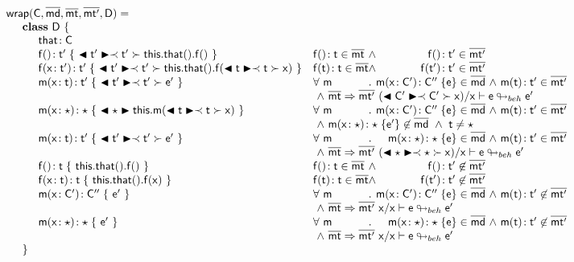 \documentclass[a4paper,USenglish]{tex/lipics-v2016}
\begin{document}
\scriptsize
\newcommand{\bscast}[2]{\EM{\BehCast{#1}{\ShaCast{#1}{#2}}}}
\vspace{4mm}
\[\begin{array}{@{}ll@{}l@{}r@{~}c@{~}r}
    \wrap\C{\b\md}\bmt\bmtp\D = \\
\SP \class ~\D ~ \{\\
\SPP \Fdef\that\C \\
\SPP \Mdefz\f{\tp}{~\bscast\tp{\Get{\Get\this\that}\f}~}
&    \Mtype\f{}\t\in\bmt &\wedge& \Mtype\f{}\tp \in \bmtp
\\
\SPP \Mdef\f\x\tp\tp {~\bscast\tp{\Set{\Get\this\that}\f{\bscast\t\x}}~}
&    \Mtype\f\t\t \in \bmt &\wedge& \Mtype\f\tp\tp \in \bmtp
\\
\SPP \Mdef\m\x\t\tp {~\bscast\tp{{\ep}}~}
&     \All \m \Mdef\m\x\Cp\Cpp\e\in\b\md &\wedge& \Mtype\m\t\tp\in\bmtp \\
&\multicolumn{5}{l}{~\wedge~\rtranst{\bmt}\bmtp{(\bscast\Cp\x)}\x{\e}{\ep}}
\\
\SPP \Mdef\m\x\any\any {~\BehCast\any{\Call\this\m{\bscast{\t}\x}}~}
&     \All \m \Mdef\m\x\Cp\Cpp\e\in\b\md &\wedge& \Mtype\m\t\tp\in\bmtp\\
&\multicolumn{5}{l}{~\wedge~\Mdef\m\x\any\any{\e'}\not\in\b\md~\wedge~\t\neq\any}
\\
\SPP \Mdef\m\x\t\tp{~\bscast\tp{\ep}~}
&    \All \m \Mdef\m\x\any\any\e\in\b\md &\wedge& \Mtype\m\t\tp\in\bmtp \\
&\multicolumn{5}{l}{~\wedge~\rtranst{\bmt}\bmtp{(\bscast\any\x)}\x\e{\ep}}
\\
\SPP \Mdefz\f\t { ~\Get{\Get\this\that}\f~}
&    \Mtype\f{}\t \in \bmt &\wedge& \Mtype\f{}\tp \not\in \bmtp
\\
\SPP \Mdef\f\x\t\t { ~\Set{\Get\this\that}\f\x~}
&    \Mtype\f\t\t \in \bmt&\wedge& \Mtype\f\tp\tp \not\in \bmtp
\\
\SPP \Mdef\m\x{\Cp}{\Cpp} {~\ep~}
&    \All \m  \Mdef\m\x\Cp\Cpp\e\in\b\md &\wedge& \Mtype\m\t\tp\not\in \bmtp \\
&\multicolumn{5}{l}{~\wedge~\rtranst{\bmt}\bmtp\x\x{\e}{\ep}}
\\
\SPP \Mdef\m\x\any\any {~\ep~}
&    \All \m  \Mdef\m\x\any\any\e\in\b\md  &\wedge& \Mtype\m\t\tp\not\in\bmtp \\
&\multicolumn{5}{l}{~\wedge~\rtranst{\bmt}\bmtp\x\x{\e}{\ep}}
\\
\SP \}

\end{array}\]
\end{document}
